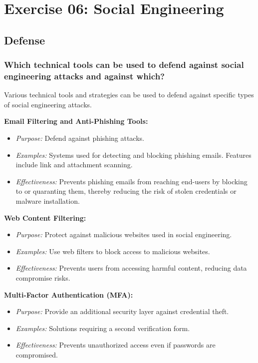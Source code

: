 \section{Exercise 06: Social Engineering}

\subsection{Defense}
\subsubsection{Which technical tools can be used to defend against social engineering attacks and against which?}
Various technical tools and strategies can be used to defend against specific types of social engineering attacks.

\textbf{Email Filtering and Anti-Phishing Tools:}
\begin{itemize}
    \item \textit{Purpose:} Defend against phishing attacks.
    \item \textit{Examples:} Systems used for detecting and blocking phishing emails. Features include link and attachment scanning.
    \item \textit{Effectiveness:} Prevents phishing emails from reaching end-users by blocking to or quaranting them, thereby reducing the risk of stolen credentials or malware installation.
\end{itemize}

\textbf{Web Content Filtering:}
\begin{itemize}
    \item \textit{Purpose:} Protect against malicious websites used in social engineering.
    \item \textit{Examples:} Use web filters to block access to malicious websites.
    \item \textit{Effectiveness:} Prevents users from accessing harmful content, reducing data compromise risks.
\end{itemize}

\textbf{Multi-Factor Authentication (MFA):}
\begin{itemize}
    \item \textit{Purpose:} Provide an additional security layer against credential theft.
    \item \textit{Examples:} Solutions requiring a second verification form.
    \item \textit{Effectiveness:} Prevents unauthorized access even if passwords are compromised.
\end{itemize}

